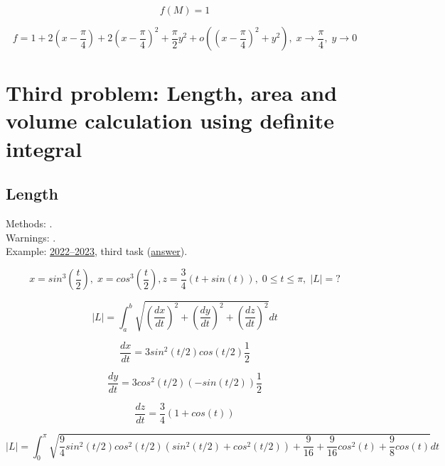 \documentclass{article}
\begin{document}
\begin{equation*}
    f(M) = 1
\end{equation*}

\begin{equation}
    f =1 + 2(x-\frac{\pi}{4}) + 2(x-\frac{\pi}{4})^2 + \frac{\pi}{2}y^2 + o((x-\frac{\pi}{4})^2+y^2), \; x \rightarrow \frac{\pi}{4}, \; y \rightarrow 0
\end{equation}


\newpage
\section{Third problem:  Length, area and volume calculation using definite integral}

\subsection{Length}

Methods: . \\
Warnings: . \\
Example: \href{https://old.mipt.ru/education/chair/mathematics/exams/exams/2022-23/%D0%9C%D0%90%D0%98%D0%B8%D0%A0_%D0%92_23.pdf}{2022–2023}, third task (\href{https://old.mipt.ru/education/chair/mathematics/exams/exams/2022-23/%D0%9C%D0%90%D0%98%D0%B8%D0%A0_%D0%92_23%D0%BE%D1%82%D0%B2%D0%B5%D1%82%D1%8B.pdf}{answer}).

\begin{equation}
    x = sin^3(\frac{t}{2}), \; x = cos^3(\frac{t}{2}), z = \frac{3}{4}(t+sin(t)), \; 0 \leq t \leq \pi, \; |L|=?
\end{equation}

\begin{equation}
    |L| = \int_{a}^{b} \sqrt{(\frac{dx}{dt})^2+(\frac{dy}{dt})^2+(\frac{dz}{dt})^2}dt
\end{equation}

\begin{equation*}
    \frac{dx}{dt} = 3sin^2(t/2) cos(t/2) \frac{1}{2}
\end{equation*}

\begin{equation*}
    \frac{dy}{dt} = 3cos^2(t/2) (-sin(t/2)) \frac{1}{2}
\end{equation*}

\begin{equation*}
    \frac{dz}{dt} = \frac{3}{4}(1+cos(t))
\end{equation*}

\begin{equation*}
    |L| = \int_{0}^{\pi} \sqrt{\frac{9}{4} sin^2(t/2) cos^2(t/2) (sin^2(t/2)+cos^2(t/2))+\frac{9}{16}+\frac{9}{16}cos^2(t)+\frac{9}{8}cos(t)}dt
\end{equation*}
\end{document}
